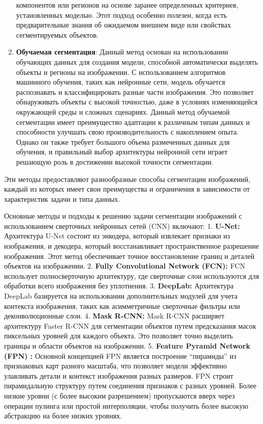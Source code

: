 \documentclass[11pt]{article}
\begin{document}
\begin{enumerate}
  компонентов или регионов на основе заранее определенных критериев,
  установленных моделью. Этот подход особенно полезен, когда есть
  предварительные знания об ожидаемом внешнем виде или свойствах
  сегментируемых объектов.
\item
  \textbf{Обучаемая сегментация}: Данный метод основан на использовании
  обучающих данных для создания модели, способной автоматически выделять
  объекты и регионы на изображении. С использованием алгоритмов
  машинного обучения, таких как нейронные сети, модель обучается
  распознавать и классифицировать разные части изображения. Это
  позволяет обнаруживать объекты с высокой точностью, даже в условиях
  изменяющейся окружающей среды и сложных сценариях. Данный метод
  обучаемой сегментации имеет преимущество адаптации к различным типам
  данных и способности улучшать свою производительность с накоплением
  опыта. Однако он также требует большого объема размеченных данных для
  обучения, и правильный выбор архитектуры нейронной сети играет
  решающую роль в достижении высокой точности сегментации.
\end{enumerate}

Эти методы предоставляют разнообразные способы сегментации изображений,
каждый из которых имеет свои преимущества и ограничения в зависимости от
характеристик задачи и типа данных.

    Основные методы и подходы к решению задачи сегментации изображений с
использованием сверточных нейронных сетей (CNN) включают: 1.
\textbf{U-Net:} Архитектура U-Net состоит из энкодера, который извлекает
признаки из изображения, и декодера, который восстанавливает
пространственное разрешение изображения. Этот метод обеспечивает точное
восстановление границ и деталей объектов на изображении. 2.
\textbf{Fully Convolutional Network (FCN):} FCN использует
полносверточную архитектуру, где сверточные слои используются для
обработки всего изображения без уплотнения. 3. \textbf{DeepLab:}
Архитектура DeepLab базируется на использовании дополнительных модулей
для учета контекста изображения, таких как асимметричные сверточные
фильтры или деконволюционные слои. 4. \textbf{Mask R-CNN:} Mask R-CNN
расширяет архитектуру Faster R-CNN для сегментации объектов путем
предсказания масок пиксельных уровней для каждого объекта. Это позволяет
точно выделить границы и области объектов на изображении. 5.
\textbf{Feature Pyramid Network (FPN) :} Основной концепцией FPN
является построение ``пирамиды'' из признаковых карт разного масштаба,
что позволяет модели эффективно улавливать детали и контекст изображения
разных размеров. FPN строит пирамидальную структуру путем соединения
признаков с разных уровней. Более низкие уровни (с более высоким
разрешением) пропускаются вверх через операции пулинга или простой
интерполяции, чтобы получить более высокую абстракцию на более низких
уровнях.
\end{document}
